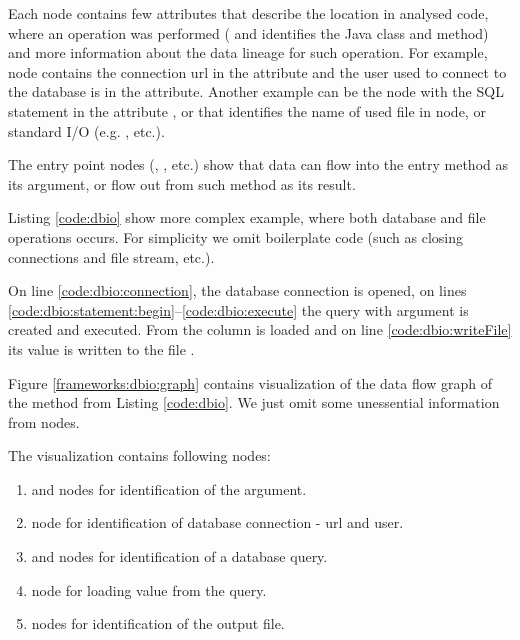 Each node contains few attributes that describe the location in analysed code, where an operation was performed
( and  identifies the Java class and method)
and more information about the data lineage for such operation.
For example,  node contains the connection url in the 
attribute and the user used to connect to the database is in the  attribute.
Another example can be the  node with the SQL statement in the attribute ,
or  that identifies the name of used file in  node,
or standard I/O (e.g. , etc.).

The entry point nodes (, , etc.) show that data can flow
into the entry method as its argument, or flow out from such method as its result.

Listing \ref{code:dbio} show more complex example, where both database and file
operations occurs. For simplicity we omit boilerplate code (such as closing connections and file stream, etc.).

On line \ref{code:dbio:connection}, the database connection is opened,
on lines \ref{code:dbio:statement:begin}--\ref{code:dbio:execute} the query
with  argument is created and executed. From  the 
column is loaded and on line \ref{code:dbio:writeFile} its value is written to the file .


Figure \ref{frameworks:dbio:graph} contains visualization of the data flow graph of the\break
{} method from Listing \ref{code:dbio}.
We just omit some unessential information from nodes.

The visualization contains following nodes:
\begin{enumerate}
  \item {} and  nodes for identification of the  argument.
  \item {} node for identification of database connection - url and user.
  \item {} and  nodes for identification of a database query.
  \item {} node for loading value from the query.
  \item {} nodes for identification of the output file.
\end{enumerate}

